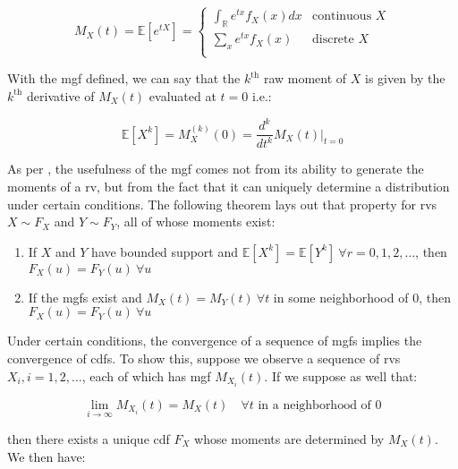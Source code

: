 \documentclass{report}
\begin{document}
\begin{equation}\label{eq:mgf-1}
    M_X(t) = \mathbb{E}\left[e^{tX}\right] = \begin{cases}
        \int_{\mathbb{R}} e^{tx} f_X(x) dx & \text{continuous } X \\
        \sum_x e^{tx} f_X(x) & \text{discrete } X \\
    \end{cases}
\end{equation}

With the \gls{mgf} defined, we can say that the $k^{\text{th}}$ raw moment of $X$ is given by the $k^{\text{th}}$ derivative of $M_X(t)$ evaluated at $t = 0$ i.e.:

\begin{equation}\label{eq:mgf-2}
    \mathbb{E}\left[X^k\right] = M_X^{(k)}(0) = \frac{d^k}{dt^k} M_X(t) \bigg |_{t=0}
\end{equation}

As per \cite[Chapter~2.3]{casella_statistical_2002}, the usefulness of the \gls{mgf} comes not from its ability to generate the moments of a \gls{rv}, but from the fact that it can uniquely determine a distribution under certain conditions. The following theorem lays out that property for \glspl{rv} $X \sim F_X$ and $Y \sim F_Y$, all of whose moments exist:

\begin{enumerate}
    \item If $X$ and $Y$ have bounded support and $\mathbb{E}[X^k] = \mathbb{E}[Y^k] \: \forall r = 0, 1, 2, \dots$, then $F_X(u) = F_Y(u) \: \forall u$
    \item If the \glspl{mgf} exist and $M_X(t) = M_Y(t) \: \forall t$ in some neighborhood of 0, then $F_X(u) = F_Y(u) \: \forall u$
\end{enumerate}

Under certain conditions, the convergence of a sequence of \glspl{mgf} implies the convergence of \glspl{cdf}. To show this, suppose we observe a sequence of \glspl{rv} $X_i, i = 1, 2, \dots$, each of which has \gls{mgf} $M_{X_i}(t)$. If we suppose as well that:

\begin{equation}\label{eq:mgf-convergence-1}
    \lim_{i \to \infty} M_{X_i}(t) = M_X(t) \quad \forall t \text{ in a neighborhood of } 0
\end{equation}

then there exists a unique \gls{cdf} $F_X$ whose moments are determined by $M_X(t)$. We then have:
\end{document}
